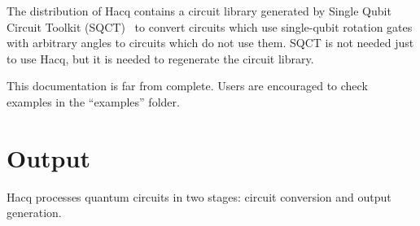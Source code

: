 \documentclass[11pt]{article}
\begin{document}
The distribution of Hacq contains a circuit library
generated by Single Qubit Circuit Toolkit (SQCT)~\cite{KliMasMos-SQCT,KliMasMos13}
to convert circuits which use single-qubit rotation gates with arbitrary angles
to circuits which do not use them.
SQCT is not needed just to use Hacq,
but it is needed to regenerate the circuit library.

This documentation is far from complete.
Users are encouraged to check examples in the ``examples'' folder.

\section{Output}

Hacq processes quantum circuits in two stages: circuit conversion and output generation.
\end{document}
